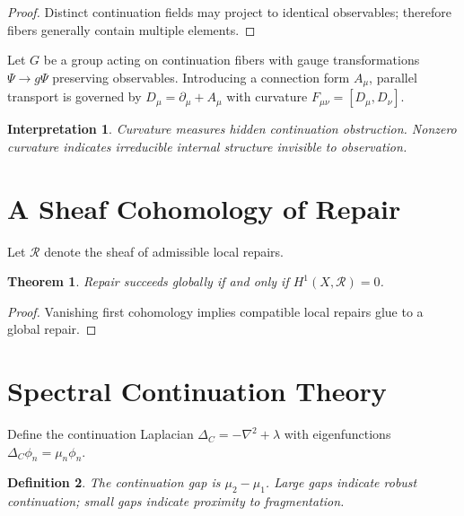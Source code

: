 \documentclass[12pt,a4paper]{article}
\newtheorem{theorem}{Theorem}[section]
\newtheorem{definition}[theorem]{Definition}
\newtheorem*{interpretation}{Interpretation}
\begin{document}
\begin{proof}
Distinct continuation fields may project to identical observables; therefore fibers generally contain multiple elements.
\end{proof}

Let $G$ be a group acting on continuation fibers with gauge transformations $\Psi \to g\Psi$ preserving observables. Introducing a connection form $A_\mu$, parallel transport is governed by $D_\mu = \partial_\mu + A_\mu$ with curvature $F_{\mu\nu} = [D_\mu, D_\nu]$.

\begin{interpretation}
Curvature measures hidden continuation obstruction. Nonzero curvature indicates irreducible internal structure invisible to observation.
\end{interpretation}

\section{A Sheaf Cohomology of Repair}

Let $\mathcal{R}$ denote the sheaf of admissible local repairs.

\begin{theorem}
Repair succeeds globally if and only if $H^1(X, \mathcal{R}) = 0$.
\end{theorem}

\begin{proof}
Vanishing first cohomology implies compatible local repairs glue to a global repair.
\end{proof}

\section{Spectral Continuation Theory}

Define the continuation Laplacian $\Delta_C = -\nabla^2 + \lambda$ with eigenfunctions $\Delta_C\phi_n = \mu_n\phi_n$.

\begin{definition}
The \emph{continuation gap} is $\mu_2 - \mu_1$. Large gaps indicate robust continuation; small gaps indicate proximity to fragmentation.
\end{definition}
\end{document}
